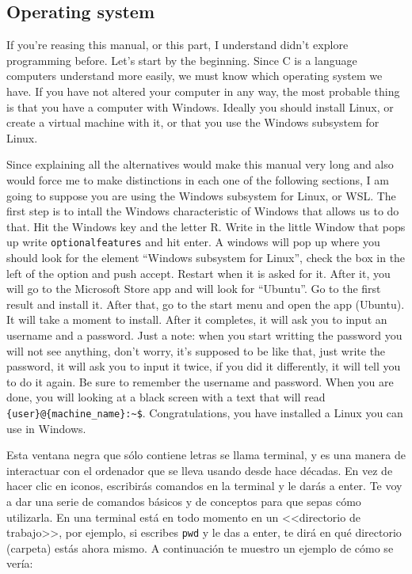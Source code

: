 \documentclass[a4paper]{article}
\begin{document}
\subsection{Operating system}
If you're reasing this manual, or this part, I understand didn't explore
programming before. Let's start by the beginning. Since C is a language
computers understand more easily, we must know which operating system we have.
If you have not altered your computer in any way, the most probable thing is
that you have a computer with Windows. Ideally you should install Linux, or
create a virtual machine with it, or that you use the Windows subsystem for
Linux.

Since explaining all the alternatives would make this manual very long and also
would force me to make distinctions in each one of the following sections, I am
going to suppose you are using the Windows subsystem for Linux, or WSL. The
first step is to intall the Windows characteristic of Windows that allows us to
do that. Hit the Windows key and the letter R. Write in the little Window that
pops up write \verb!optionalfeatures! and hit enter. A windows will pop up
where you should look for the element ``Windows subsystem for Linux'', check the
box in the left of the option and push accept. Restart when it is asked for it.
After it, you will go to the Microsoft Store app and will look for ``Ubuntu''.
Go to the first result and install it. After that, go to the start menu and
open the app (Ubuntu). It will take a moment to install. After it completes,
it will ask you to input an username and a password. Just a note: when you start
writting the password you will not see anything, don't worry, it's supposed to
be like that, just write the password, it will ask you to input it twice, if
you did it differently, it will tell you to do it again. Be sure to remember
the username and password. When you are done, you will looking at a black screen
with a text that will read \verb!{user}@{machine_name}:~$!. Congratulations,
you have installed a Linux you can use in Windows.

Esta ventana negra que sólo contiene letras se llama terminal, y es una manera
de interactuar con el ordenador que se lleva usando desde hace décadas. En vez
de hacer clic en iconos, escribirás comandos en la terminal y le darás a enter.
Te voy a dar una serie de comandos básicos y de conceptos para que sepas cómo
utilizarla. En una terminal está en todo momento en un <<directorio de trabajo>>,
por ejemplo, si escribes \verb!pwd! y le das a enter, te dirá en qué
directorio (carpeta) estás ahora mismo. A continuación te muestro un ejemplo
de cómo se vería:
\end{document}
